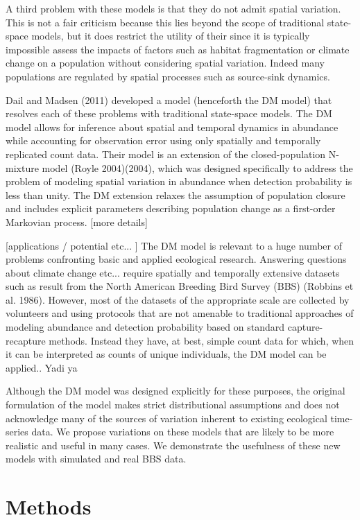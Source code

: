 \documentclass{article}
\begin{document}
A third problem with these models is that they do not admit
spatial variation. This is not a fair criticism because this
lies beyond the scope of traditional state-space models, but
it does restrict the utility of their since it is typically
impossible assess the impacts of factors such as habitat
fragmentation or climate change on a population without
considering spatial variation. Indeed many populations are
regulated by spatial processes such as source-sink dynamics.

Dail and Madsen (2011) developed a model (henceforth the DM model)
that resolves each of these problems with traditional state-space
models. The DM model allows for inference about spatial and temporal
dynamics in abundance while accounting for observation error using
only spatially and temporally replicated count data.  Their model is
an extension of the closed-population N-mixture model (Royle
2004)(2004), which was designed specifically to address the problem of
modeling spatial variation in abundance when detection probability is
less than unity. The DM extension relaxes the assumption of population
closure and includes explicit parameters describing population change
as a first-order Markovian process. [more details]

[applications / potential etc... ] The DM model is relevant to a huge
number of problems confronting basic and applied ecological
research. Answering questions about climate change etc... require
spatially and temporally extensive datasets such as result from the
North American Breeding Bird Survey (BBS) (Robbins et
al. 1986). However, most of the datasets of the appropriate scale are
collected by volunteers and using protocols that are not amenable to
traditional approaches of modeling abundance and detection probability
based on standard capture-recapture methods. Instead they have, at
best, simple count data for which, when it can be interpreted as
counts of unique individuals, the DM model can be applied.. Yadi ya

Although the DM model was designed explicitly for these purposes, the
original formulation of the model makes strict distributional
assumptions and does not acknowledge many of the sources of variation
inherent to existing ecological time-series data.  We propose
variations on these models that are likely to be more realistic and
useful in many cases.  We demonstrate the usefulness of these new
models with simulated and real BBS data.


\section{Methods}
\end{document}
